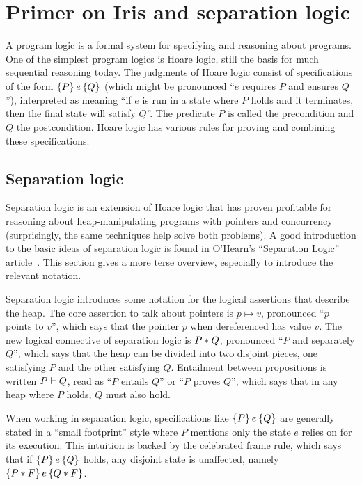 \section{Primer on Iris and separation logic}%
\label{sec:perennial:iris}

A program logic is a formal system for specifying and reasoning about programs.
One of the simplest program logics is Hoare logic, still the basis for much
sequential reasoning today. The judgments of Hoare logic consist of
specifications of the form $\hoare{P}{e}{Q}$ (which might be pronounced ``$e$
requires $P$ and ensures $Q$''), interpreted as meaning
``if $e$ is run in a state where $P$ holds and it terminates, then the final
state will satisfy $Q$''. The predicate $P$ is called the precondition and $Q$
the postcondition. Hoare logic has various rules for proving and combining
these specifications.

\subsection{Separation logic}

Separation logic is an extension of Hoare logic that has proven profitable for
reasoning about heap-manipulating programs with pointers and concurrency
(surprisingly, the same techniques help solve both problems). A good
introduction to the basic ideas of separation logic is found in O'Hearn's
``Separation Logic'' article~\cite{ohearn:seplogic}. This section gives a more
terse overview, especially to introduce the relevant notation.

Separation logic introduces some notation for the logical assertions that
describe the heap. The core assertion to talk about pointers is $p \mapsto v$,
pronounced ``$p$ points to $v$'',
which says that the pointer $p$ when dereferenced has value $v$. The new logical
connective of separation logic is
$P * Q$, pronounced ``$P$ and separately $Q$'', which says that the heap can
be divided into two disjoint pieces, one satisfying $P$ and the other satisfying
$Q$. Entailment between propositions is written $P \vdash Q$, read as ``$P$
entails $Q$'' or ``$P$ proves $Q$'', which says that in any heap where $P$
holds, $Q$ must also hold.

When working in separation logic, specifications like $\hoare{P}{e}{Q}$ are
generally stated in a ``small footprint'' style where $P$ mentions only the
state $e$ relies on for its execution. This intuition is backed by the
celebrated frame rule, which says that if $\hoare{P}{e}{Q}$ holds, any disjoint
state is unaffected, namely $\hoare{P \sep F}{e}{Q \sep F}$.

